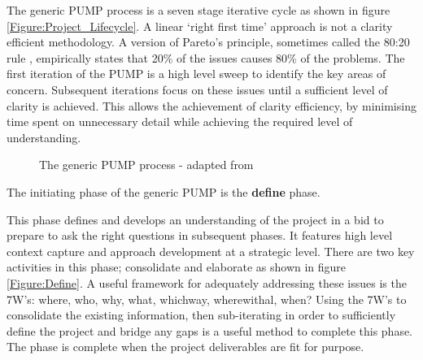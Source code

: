 The generic PUMP process is a seven stage iterative cycle as shown in figure \ref{Figure:Project_Lifecycle}. 
A linear `right first time' approach is not a clarity efficient methodology.
A version of Pareto's principle, sometimes called the 80:20 rule \citep{Pareto1992}, empirically states that 20\% of the issues causes 80\% of the problems. 
The first iteration of the PUMP is a high level sweep to identify the key areas of concern.
Subsequent iterations focus on these issues until a sufficient level of clarity is achieved.
This allows the achievement of clarity efficiency, by minimising time spent on unnecessary detail while achieving the required level of understanding.

\begin{figure}[!h]
  \centering
{} \quad
{}
\caption{The generic PUMP process - adapted from \cite{chapman}}
\label{Figure:GenericPUMP_Both}
\end{figure}

The initiating phase of the generic PUMP is the \textbf{define} phase.

This phase defines and develops an understanding of the project in a bid to prepare to ask the right questions in subsequent phases.
It features high level context capture and approach development at a strategic level.
There are two key activities in this phase; consolidate and elaborate as shown in figure \ref{Figure:Define}.
A useful framework for adequately addressing these issues is the 7W's: where, who, why, what, whichway, wherewithal, when? 
Using the 7W's to consolidate the existing information, then sub-iterating in order to sufficiently define the project and bridge any gaps is a useful method to complete this phase.
The phase is complete when the project deliverables are fit for purpose.

